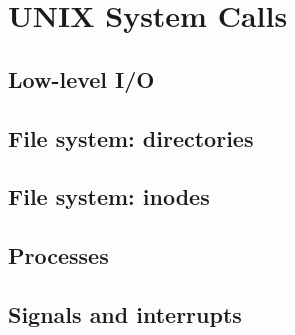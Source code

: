 \chapter{UNIX System Calls}
\label{chap:unix_system_calls}
\section{Low-level I/O}
\section{File system: directories}
\section{File system: inodes}
\section{Processes}
\section{Signals and interrupts}
